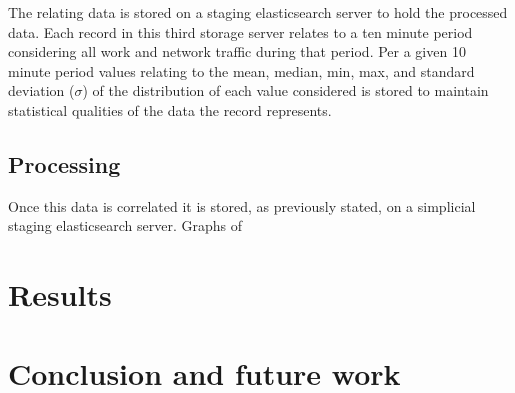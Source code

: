 \documentclass[sigconf]{acmart}
\begin{document}
The relating data is stored on a staging elasticsearch server to hold the processed data. Each record in this third storage server relates to a ten minute period considering all work and network traffic during that period. Per a given 10 minute period values relating to the mean, median, min, max, and standard deviation ($\sigma$) of the distribution of each value considered is stored to maintain statistical qualities of the data the record represents.
\subsection{Processing}
Once this data is correlated it is stored, as previously stated, on a simplicial staging elasticsearch server. Graphs of 
\section{Results}

\section{Conclusion and future work}
\end{document}
